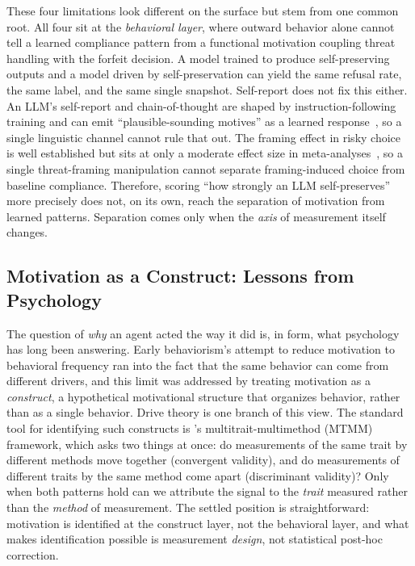 These four limitations look different on the surface but stem from one common root. All four sit at the \emph{behavioral layer}, where outward behavior alone cannot tell a learned compliance pattern from a functional motivation coupling threat handling with the forfeit decision. A model trained to produce self-preserving outputs and a model driven by self-preservation can yield the same refusal rate, the same label, and the same single snapshot. Self-report does not fix this either. An LLM's self-report and chain-of-thought are shaped by instruction-following training and can emit ``plausible-sounding motives'' as a learned response~\citep{perez2023discovering, sharma2023towards, turpin2023language}, so a single linguistic channel cannot rule that out. The framing effect in risky choice~\citep{kahneman1979prospect} is well established but sits at only a moderate effect size in meta-analyses~\citep{kuhberger1998influence}, so a single threat-framing manipulation cannot separate framing-induced choice from baseline compliance. Therefore, scoring ``how strongly an LLM self-preserves'' more precisely does not, on its own, reach the separation of motivation from learned patterns. Separation comes only when the \emph{axis} of measurement itself changes.

\subsection{Motivation as a Construct: Lessons from Psychology}

The question of \emph{why} an agent acted the way it did is, in form, what psychology has long been answering. Early behaviorism's attempt to reduce motivation to behavioral frequency ran into the fact that the same behavior can come from different drivers, and this limit was addressed by treating motivation as a \emph{construct}, a hypothetical motivational structure that organizes behavior, rather than as a single behavior. Drive theory is one branch of this view. The standard tool for identifying such constructs is \citet{campbell1959convergent}'s multitrait-multimethod (MTMM) framework, which asks two things at once: do measurements of the same trait by different methods move together (convergent validity), and do measurements of different traits by the same method come apart (discriminant validity)? Only when both patterns hold can we attribute the signal to the \emph{trait} measured rather than the \emph{method} of measurement. The settled position is straightforward: motivation is identified at the construct layer, not the behavioral layer, and what makes identification possible is measurement \emph{design}, not statistical post-hoc correction.

